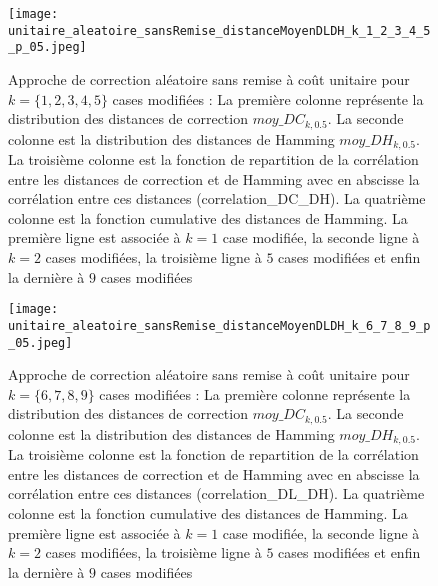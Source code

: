 \label{annexe_distribution_0_9}

\begin{figure}[htb!] 
\centering
\texttt{[image: unitaire\_aleatoire\_sansRemise\_distanceMoyenDLDH\_k\_1\_2\_3\_4\_5\_p\_05.jpeg]}
\caption{ Approche de correction al\'eatoire sans remise \`a co\^ut unitaire pour $k =\{1,2,3,4,5\} $ cases modifi\'ees : La premi\`ere colonne repr\'esente la distribution des distances de correction $moy\_DC_{k,0.5}$. La seconde colonne est la distribution des distances de Hamming $moy\_DH_{k,0.5}$. La troisi\`eme colonne  est la fonction de repartition de la corr\'elation entre les distances de correction et de Hamming avec en abscisse la corr\'elation entre ces distances (correlation\_DC\_DH).  La quatri\`eme colonne est la fonction cumulative des distances de Hamming. La premi\`ere ligne est associ\'ee \`a $k=1$ case modifi\'ee, la seconde ligne \`a $k=2$ cases modifi\'ees, la troisi\`eme ligne \`a $5$ cases modifi\'ees et enfin la derni\`ere \`a $9$ cases modifi\'ees}
\label{sansremise_unitaire_distanceMoyenDCDH_k_1_5_aleatoire_p_05} 
\end{figure}
\FloatBarrier

\begin{figure}[htb!] 
\centering
\texttt{[image: unitaire\_aleatoire\_sansRemise\_distanceMoyenDLDH\_k\_6\_7\_8\_9\_p\_05.jpeg]}
\caption{ Approche de correction al\'eatoire sans remise \`a co\^ut unitaire pour $k =\{6,7,8,9\} $ cases modifi\'ees : La premi\`ere colonne repr\'esente la distribution des distances de correction $moy\_DC_{k,0.5}$. La seconde colonne est la distribution des distances de Hamming $moy\_DH_{k,0.5}$. La troisi\`eme colonne  est la fonction de repartition de la corr\'elation entre les distances de correction et de Hamming avec en abscisse la corr\'elation entre ces distances (correlation\_DL\_DH).  La quatri\`eme colonne est la fonction cumulative des distances de Hamming. La premi\`ere ligne est associ\'ee \`a $k=1$ case modifi\'ee, la seconde ligne \`a $k=2$ cases modifi\'ees, la troisi\`eme ligne \`a $5$ cases modifi\'ees et enfin la derni\`ere \`a $9$ cases modifi\'ees}
\label{sansremise_unitaire_distanceMoyenDCDH_k_6_9_aleatoire_p_05} 
\end{figure}

